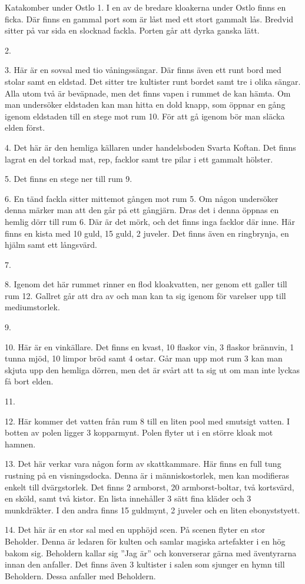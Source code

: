 Katakomber under Ostlo
1. I en av de bredare kloakerna under Ostlo finns en ficka. Där finns en gammal port som är låst med ett stort gammalt lås. Bredvid sitter på var sida en slocknad fackla. Porten går att dyrka ganska lätt.

2. 

3. Här är en sovsal med tio våningssängar. Där finns även ett runt bord med stolar samt en eldstad. Det sitter tre kultister runt bordet samt tre i olika sängar. Alla utom två är beväpnade, men det finns vapen i rummet de kan hämta. Om man undersöker eldstaden kan man hitta en dold knapp, som öppnar en gång igenom eldstaden till en stege mot rum 10. För att gå igenom bör man släcka elden först. 

4. Det här är den hemliga källaren under handelsboden Svarta Koftan. Det finns lagrat en del torkad mat, rep, facklor samt tre pilar i ett gammalt hölster.

5. Det finns en stege ner till rum 9.

6. En tänd fackla sitter mittemot gången mot rum 5. Om någon undersöker denna märker man att den går på ett gångjärn. Dras det i denna öppnas en hemlig dörr till rum 6. Där är det mörk, och det finns inga facklor där inne. Här finns en kista med 10 guld, 15 guld, 2 juveler. Det finns även en ringbrynja, en hjälm samt ett långsvärd.

7.

8. Igenom det här rummet rinner en flod kloakvatten, ner genom ett galler till rum 12. Gallret går att dra av och man kan ta sig igenom för varelser upp till mediumstorlek. 

9. 

10. Här är en vinkällare. Det finns en kvast, 10 flaskor vin, 3 flaskor brännvin, 1 tunna mjöd, 10 limpor bröd samt 4 ostar. Går man upp mot rum 3 kan man skjuta upp den hemliga dörren, men det är svårt att ta sig ut om man inte lyckas få bort elden.

11. 

12. Här kommer det vatten från rum 8 till en liten pool med smutsigt vatten. I botten av polen ligger 3 kopparmynt. Polen flyter ut i en större kloak mot hamnen.

13. Det här verkar vara någon form av skattkammare. Här finns en full tung rustning på en visningsdocka. Denna är i människostorlek, men kan modifieras enkelt till dvärgstorlek. Det finns 2 armborst, 20 armborst-boltar, två kortsvärd, en sköld, samt två kistor. En lista innehåller 3 sätt fina kläder och 3 munkdräkter. I den andra finns 15 guldmynt, 2 juveler och en liten ebonyststyett. 

14. Det här är en stor sal med en upphöjd scen. På scenen flyter en stor Beholder. Denna är ledaren för kulten och samlar magiska artefakter i en hög bakom sig. Beholdern kallar sig ”Jag är” och konverserar gärna med äventyrarna innan den anfaller. Det finns även 3 kultister i salen som sjunger en hymn till Beholdern. Dessa anfaller med Beholdern.
